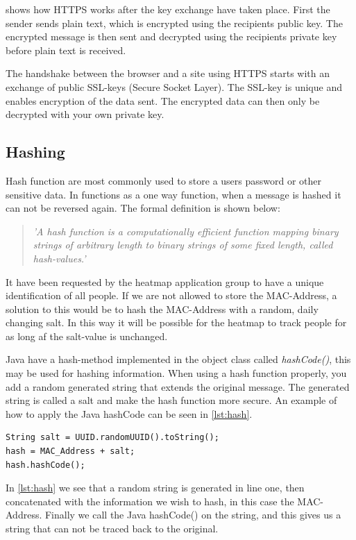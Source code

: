  shows how HTTPS works after the key exchange have taken place. First the sender sends plain text, which is encrypted using the recipients public key. The encrypted message is then sent and decrypted using the recipients private key before plain text is received.

The handshake between the browser and a site using HTTPS starts with an exchange of public SSL-keys (Secure Socket Layer). The SSL-key is unique and enables encryption of the data sent. The encrypted data can then only be decrypted with your own private key\cite{HTTPS}. 

\subsection*{Hashing}
Hash function are most commonly used to store a users password or other sensitive data. In functions as a one way function, when a message is hashed it can not be reversed again. The formal definition is shown below:
\begin{quote}
\textit{'A hash function is a computationally efficient function mapping binary strings of arbitrary length to binary strings of some fixed length, called hash-values.'\cite{Hash_def}}
\end{quote}

It have been requested by the heatmap application group to have a unique identification of all people. If we are not allowed to store the MAC-Address, a solution to this would be to hash the MAC-Address with a random, daily changing salt. In this way it will be possible for the heatmap to track people for as long af the salt-value is unchanged.

Java have a hash-method implemented in the object class called \textit{hashCode()}, this may be used for hashing information. When using a hash function properly, you add a random generated string that extends the original message. The generated string is called a salt and make the hash function more secure. An example of how to apply the Java hashCode can be seen in \cref{lst:hash}.
\begin{lstlisting}[caption={Hash a MAC-Address},label={lst:hash},language=inc_Java]
String salt = UUID.randomUUID().toString();
hash = MAC_Address + salt;
hash.hashCode();
\end{lstlisting}
In \cref{lst:hash} we see that a random string is generated in line one, then concatenated with the information we wish to hash, in this case the MAC-Address. Finally we call the Java hashCode() on the string, and this gives us a string that can not be traced back to the original.

